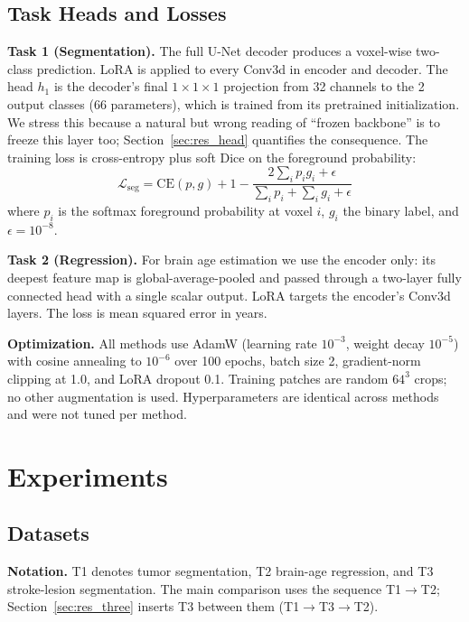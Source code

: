\documentclass[journal,twoside,web]{ieeecolor}
\begin{document}
\subsection{Task Heads and Losses}
\label{sec:heads}

\textbf{Task 1 (Segmentation).} The full U-Net decoder produces a voxel-wise two-class prediction. LoRA is applied to every Conv3d in encoder and decoder. The head $h_1$ is the decoder's final $1{\times}1{\times}1$ projection from 32 channels to the 2 output classes (66 parameters), which is trained from its pretrained initialization. We stress this because a natural but wrong reading of ``frozen backbone'' is to freeze this layer too; Section~\ref{sec:res_head} quantifies the consequence. The training loss is cross-entropy plus soft Dice on the foreground probability:
\begin{equation}
\mathcal{L}_{\text{seg}} = \text{CE}(p, g) + 1 - \frac{2 \sum_i p_i g_i + \epsilon}{\sum_i p_i + \sum_i g_i + \epsilon}
\end{equation}
where $p_i$ is the softmax foreground probability at voxel $i$, $g_i$ the binary label, and $\epsilon=10^{-8}$.

\textbf{Task 2 (Regression).} For brain age estimation we use the encoder only: its deepest feature map is global-average-pooled and passed through a two-layer fully connected head with a single scalar output. LoRA targets the encoder's Conv3d layers. The loss is mean squared error in years.

\textbf{Optimization.} All methods use AdamW (learning rate $10^{-3}$, weight decay $10^{-5}$) with cosine annealing to $10^{-6}$ over 100 epochs, batch size 2, gradient-norm clipping at 1.0, and LoRA dropout 0.1. Training patches are random $64^3$ crops; no other augmentation is used. Hyperparameters are identical across methods and were not tuned per method.

\section{Experiments}
\label{sec:experiments}

\subsection{Datasets}
\label{sec:data}

\textbf{Notation.} T1 denotes tumor segmentation, T2 brain-age regression, and T3 stroke-lesion segmentation. The main comparison uses the sequence T1$\to$T2; Section~\ref{sec:res_three} inserts T3 between them (T1$\to$T3$\to$T2).
\end{document}
